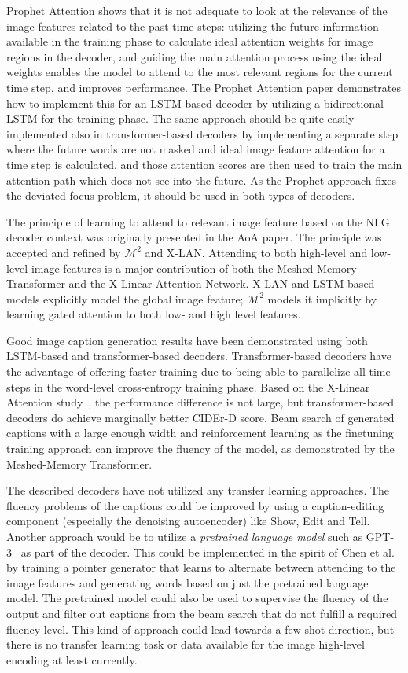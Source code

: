 \documentclass[english,twoside,openright]{HYgraduMLDS}
\begin{document}
Prophet Attention shows that it is not adequate to look at the relevance of the image features related to the past time-steps: utilizing the future information available in the training phase to calculate ideal attention weights for image regions in the decoder, and guiding the main attention process using the ideal weights enables the model to attend to the most relevant regions for the current time step, and improves performance. The Prophet Attention paper demonstrates how to implement this for an LSTM-based decoder by utilizing a bidirectional LSTM for the training phase. The same approach should be quite easily implemented also in transformer-based decoders by implementing a separate step where the future words are not masked and ideal image feature attention for a time step is calculated, and those attention scores are then used to train the main attention path which does not see into the future. As the Prophet approach fixes the deviated focus problem, it should be used in both types of decoders.

The principle of learning to attend to relevant image feature based on the NLG decoder context was originally presented in the AoA paper. The principle was accepted and refined by $\mathcal{M}^2$ and X-LAN. Attending to both high-level and low-level image features is a major contribution of both the Meshed-Memory Transformer and the X-Linear Attention Network. X-LAN and LSTM-based models explicitly model the global image feature; $\mathcal{M}^2$ models it implicitly by learning gated attention to both low- and high level features.

Good image caption generation results have been demonstrated using both LSTM-based and transformer-based decoders. Transformer-based decoders have the advantage of offering faster training due to being able to parallelize all time-steps in the word-level cross-entropy training phase. Based on the X-Linear Attention study~\cite{XLinearAN}, the performance difference is not large, but transformer-based decoders do achieve marginally better CIDEr-D score. Beam search of generated captions with a large enough width and reinforcement learning as the finetuning training approach can improve the fluency of the model, as demonstrated by the Meshed-Memory Transformer.

The described decoders have not utilized any transfer learning approaches. The fluency problems of the captions could be improved by using a caption-editing component (especially the denoising autoencoder) like Show, Edit and Tell. Another approach would be to utilize a \textit{pretrained language model} such as GPT-3~\cite{GPT3} as part of the decoder. This could be implemented in the spirit of Chen et al.~\cite{FewShot} by training a pointer generator that learns to alternate between attending to the image features and generating words based on just the pretrained language model. The pretrained model could also be used to supervise the fluency of the output and filter out captions from the beam search that do not fulfill a required fluency level. This kind of approach could lead towards a few-shot direction, but there is no transfer learning task or data available for the image high-level encoding at least currently. 
\end{document}
